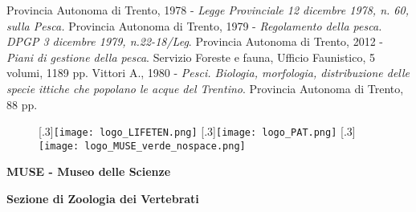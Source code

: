 \documentclass[10pt,twoside,openany,x11names,svgnames,italian,a5paper,dvipsnames,table]{memoir}
\newcommand{\backpagecolor}{Azure}
\begin{document}
\begin{thebibliography}{9}
 Provincia Autonoma di Trento, 1978 - \emph{Legge Provinciale 12 dicembre 1978, n. 60, sulla Pesca.}
 Provincia Autonoma di Trento, 1979 - \emph{Regolamento della pesca. DPGP 3 dicembre 1979, n.22-18/Leg}.
 Provincia Autonoma di Trento, 2012 - \emph{Piani di gestione della pesca}. Servizio Foreste e fauna, Ufficio Faunistico, 5 volumi, 1189 pp.
 Vittori A., 1980 - \emph{Pesci. Biologia, morfologia, distribuzione delle specie ittiche che popolano le acque del Trentino}. Provincia Autonoma di Trento, 88 pp.

\end{thebibliography}
\cleartoverso

  

\normalsize
\enlargethispage{3\baselineskip}
\thispagestyle{empty}
\pagecolor{\backpagecolor}
\begin{center}
\vspace*{\fill}

\begin{figure}[htp]
\captionsetup{font=normalsize}
\centering
{}[.3\linewidth]{\texttt{[image: logo\_LIFETEN.png]}}
[.3\linewidth]{\texttt{[image: logo\_PAT.png]}}
[.3\linewidth]{\texttt{[image: logo\_MUSE\_verde\_nospace.png]}}
\end{figure}
\textbf{\textcolor{LightGoldenrod!50!Gold}{MUSE - Museo delle Scienze}}

\vspace*{\baselineskip}

\textbf{\textcolor{LightGoldenrod}{Sezione di Zoologia dei Vertebrati}}
\end{center}
\end{document}

